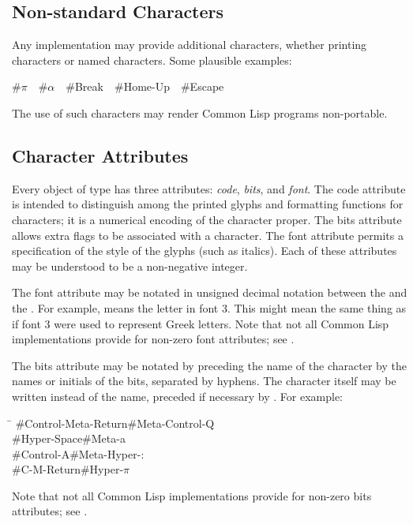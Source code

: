 {\subsection{Non-standard Characters}

Any implementation may provide additional characters, whether printing
characters or named characters.  Some plausible examples:

\newpage%

\begin{lisp}
\#{\Xbackslash}\(\pi\)~~\#{\Xbackslash}\(\alpha\)~~\#{\Xbackslash}Break~~\#{\Xbackslash}Home-Up~~\#{\Xbackslash}Escape
\end{lisp}
The use of such characters may render Common Lisp programs non-portable.

\begin{obsolete}
\subsection{Character Attributes}

Every object of type 
has three attributes: {\it code}, {\it bits}, and {\it font}.
The code attribute is intended to distinguish among the printed glyphs
and formatting functions for characters; it is a numerical encoding
of the character proper.
The bits attribute allows extra
flags to be associated with a character.  The font attribute permits
a specification of the style of the glyphs (such as italics).
Each of these attributes may be understood to be a non-negative integer.

The font attribute may be notated in unsigned decimal notation
between the \cd{\#} and the \cd{{\Xbackslash}}.  For example,
 means the letter  in font 3.
This might mean the same thing as \cd{\#{\Xbackslash}$\alpha$} if font 3
were used to represent Greek letters.
Note that not all Common Lisp implementations provide for non-zero
font attributes; see .

The bits attribute may be notated
by preceding the name of the character by the names or initials
of the bits,
separated by hyphens.  The character itself may be written
instead of the name, preceded if necessary by \cd{{\Xbackslash}}.  For example:
\begin{lisp}
\textwidth\=\kill
\#{\Xbackslash}Control-Meta-Return\>\#{\Xbackslash}Meta-Control-Q \\
\#{\Xbackslash}Hyper-Space\>\#{\Xbackslash}Meta-{\Xbackslash}a \\
\#{\Xbackslash}Control-A\>\#{\Xbackslash}Meta-Hyper-{\Xbackslash}: \\
\#{\Xbackslash}C-M-Return\>\#{\Xbackslash}Hyper-{\Xbackslash}\(\pi\)
\end{lisp}
Note that not all Common Lisp implementations provide for non-zero
bits attributes; see .
\end{obsolete}

}
